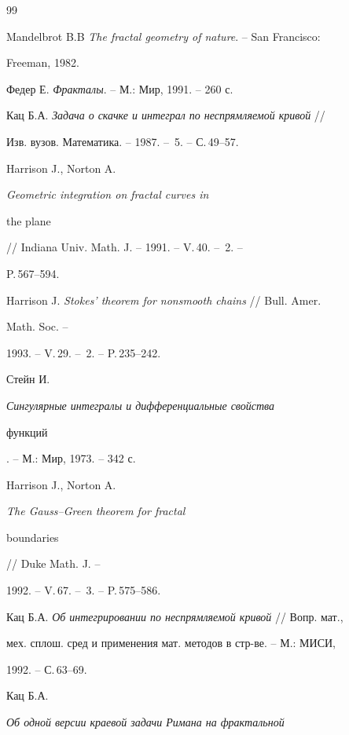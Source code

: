  


 


\begin{thebibliography}{99} 


 




Mandelbrot B.B {\em The fractal geometry of nature}. -- San Francisco: 


Freeman, 1982.




Федер Е. {\em Фракталы}. -- М.: Мир, 1991. -- 260 с. 




Кац Б.А. {\em Задача о скачке и интеграл по неспрямляемой кривой} // 


Изв. вузов. Математика. -- 1987. -- \No\,5. -- С.\,49--57.




Harrison J., Norton A. {\em Geometric integration on fractal curves in 


the plane} // Indiana Univ. Math. J. -- 1991. -- V.\,40. -- \No\,2. -- 


P.\,567--594. 




Harrison J. {\em Stokes' theorem for nonsmooth chains} // Bull. Amer. 


Math. Soc. --  


1993. -- V.\,29. -- \No\,2. -- P.\,235--242. 




Стейн И. {\em Сингулярные интегралы и дифференциальные свойства 


функций}. -- М.: Мир, 1973. -- 342 с. 




Harrison J., Norton A. {\em The Gauss--Green theorem for fractal 


boundaries} // Duke Math. J. --  


1992. -- V.\,67. -- \No\,3. -- P.\,575--586. 




Кац Б.А. {\em Об интегрировании по неспрямляемой кривой} // Вопр. мат., 


мех. сплош. сред и применения мат. методов в стр-ве. -- М.: МИСИ,  


1992. -- С.\,63--69. 




Кац Б.А. {\em Об одной версии краевой задачи Римана на фрактальной 


}
\end{thebibliography}
